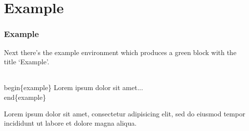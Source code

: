 \section{Example}
\label{example}
\begin{frame}\frametitle{Example}
  Next there’s the example environment which produces a green block with the title ‘Example’.
  \begin{semiverbatim}
    \\begin\{example\}\newline
    Lorem ipsum dolor sit amet...\newline
    \\end\{example\}
  \end{semiverbatim}
  \begin{example}
    Lorem ipsum dolor sit amet, consectetur adipisicing elit, sed do eiusmod tempor incididunt ut labore et dolore magna aliqua.
  \end{example} 
\end{frame}